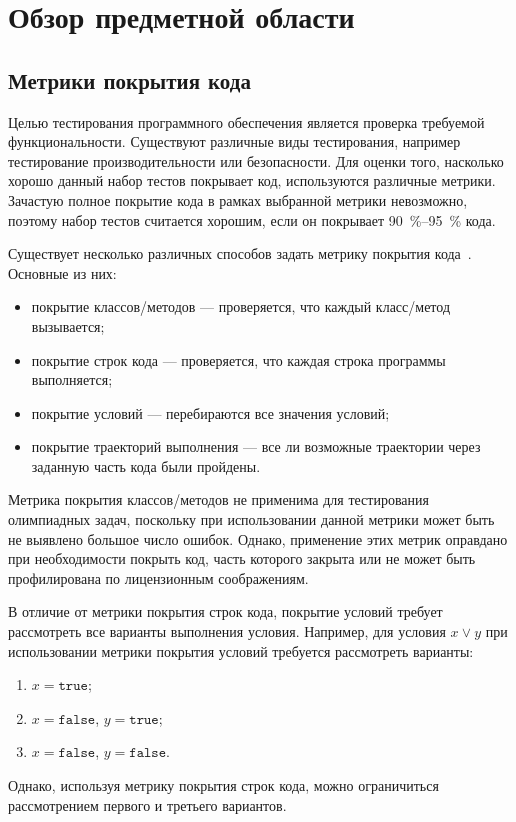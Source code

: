\chapter{Обзор предметной области}
\label{chapter1}

\section{Метрики покрытия кода}
Целью тестирования программного обеспечения является проверка требуемой функциональности. Существуют различные виды тестирования, например тестирование 
производительности или безопасности. Для оценки того, насколько хорошо данный набор тестов покрывает код, используются различные метрики. Зачастую полное 
покрытие кода в рамках выбранной метрики невозможно, поэтому набор тестов считается хорошим, если он покрывает 90~\%--95~\% кода.

Существует несколько различных способов задать метрику покрытия кода~\cite{ipl_cite,too_old_metrics}. Основные из них:
\begin{itemize}
 \item покрытие классов/методов --- проверяется, что каждый класс/метод вызывается;
 \item покрытие строк кода --- проверяется, что каждая строка программы выполняется;
 \item покрытие условий --- перебираются все значения условий;
 \item покрытие траекторий выполнения --- все ли возможные траектории через заданную часть кода были пройдены. 
\end{itemize}

Метрика покрытия классов/методов не применима для тестирования олимпиадных задач, поскольку при использовании данной метрики может быть не выявлено большое 
число ошибок. Однако, применение этих метрик оправдано при необходимости покрыть код, часть которого закрыта или не может быть профилирована по лицензионным 
соображениям.

В отличие от метрики покрытия строк кода, покрытие условий требует рассмотреть все варианты выполнения условия. Например, для условия $x \vee y$ при 
использовании метрики покрытия условий требуется рассмотреть варианты:
\begin{enumerate}
 \item $x = \texttt{true}$;
 \item $x = \texttt{false}$, $y = \texttt{true}$;
 \item $x = \texttt{false}$, $y = \texttt{false}$.
\end{enumerate}
Однако, используя метрику покрытия строк кода, можно ограничиться рассмотрением первого и третьего вариантов.

